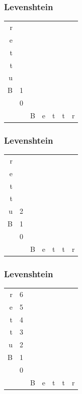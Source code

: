 \documentclass[10pt]{beamer}
\begin{document}
\begin{frame}[fragile]
  \frametitle{Levenshtein}

  \centering
\begin{tabular}{ r || c c c c c c  }
  r &   &  &  &  &  &  \\
  e &   &  &  &  &  &  \\
  t &   &  &  &  &  &  \\ 
  t &   &  &  &  &  &  \\
  u &   &  &  &  &  &  \\
  B & 1 &  &  &  &  &  \\
    & 0 &  &  &  &  &  \\
  \hline
    &   & B & e & t & t & r \\
\end{tabular}

  
\end{frame}



\begin{frame}[fragile]
  \frametitle{Levenshtein}

  \centering
\begin{tabular}{ r || c c c c c c  }
  r &   &  &  &  &  &  \\
  e &   &  &  &  &  &  \\
  t &   &  &  &  &  &  \\ 
  t &   &  &  &  &  &  \\
  u & 2 &  &  &  &  &  \\
  B & 1 &  &  &  &  &  \\
    & 0 &  &  &  &  &  \\
  \hline
    &   & B & e & t & t & r \\
\end{tabular}

  
\end{frame}


\begin{frame}[fragile]
  \frametitle{Levenshtein}

  \centering
\begin{tabular}{ r || c c c c c c  }
  r & 6 &  &  &  &  &  \\
  e & 5 &  &  &  &  &  \\
  t & 4 &  &  &  &  &  \\
  t & 3 &  &  &  &  &  \\
  u & 2 &  &  &  &  &  \\
  B & 1 &  &  &  &  &  \\
    & 0 &  &  &  &  &  \\
  \hline
    &   & B & e & t & t & r \\
\end{tabular}

  
\end{frame}
\end{document}
